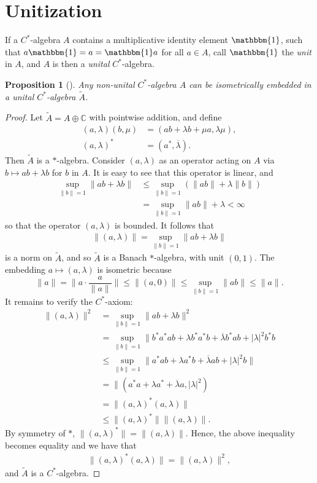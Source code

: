 \documentclass[12pt,a4paper]{report}
\theoremstyle{plain}
\newtheorem*{prop*}{Proposition}
\theoremstyle{definition}
\newcommand{\1}{\mathbbm{1}}
\newcommand{\C}{\mathbb{C}}
\begin{document}
\section{Unitization}
If a $C^\ast$-algebra $A$ contains a multiplicative identity element $\1$, such that 
$a \1 = a = \1  a$ for all $a \in A$, call $\1$ the \emph{unit} 
in $A$, and $A$ is then a \emph{unital} $C^\ast$-algebra.

\begin{prop*}[{\cite[I.1.3]{davidson96}}]
	Any non-unital $C^\ast$-algebra $A$ can be isometrically embedded in a unital $C^\ast$-algebra 
	$\tilde{A}$.
\end{prop*}
\begin{proof}
	Let $\tilde{A} = A \oplus \C$ with pointwise addition, and define
	\begin{align*}
		(a,\lambda) (b,\mu) &= (ab+\lambda b + \mu a, \lambda \mu),				\\
		(a,\lambda)^\ast &= (a^\ast,\overline{\lambda}).
	\end{align*}
	Then $\tilde{A}$ is a $\ast$-algebra. 
	Consider $(a,\lambda)$ as an operator acting on $A$ via $b\mapsto ab+\lambda b$ for $b$ in $A$. It 
	is easy to see that this operator is linear, and 
	\begin{align*}
				\sup_{\|b\|=1}\|ab+\lambda b\| 
		&\leq 	\sup_{\|b\|=1} (\|ab\|+ \lambda\|b\|)							\\
		&=		\sup_{\|b\|=1} \|ab\|+ \lambda < \infty
	\end{align*}
	so that the operator $(a,\lambda)$ is bounded. It follows that
	\begin{align*}
		\|(a,\lambda)\| = \sup_{\|b\|=1}\|ab+\lambda b\|
	\end{align*}
	is a norm on $\tilde{A}$, and so $\tilde{A}$ is a Banach $\ast$-algebra, with unit $(0,1)$.
	The embedding $a\mapsto(a,\lambda)$ is isometric because 
	\[
		\|a\| = \|a\cdot\frac{a}{\|a\|}\| \leq \|(a,0)\| \leq \sup_{\|b\|=1}{\|ab\|} \leq \|a\|.
	\]
	It remains to verify the $C^\ast$-axiom:
	\begin{align*}
				\|(a,\lambda)\|^2 
		&=		\sup_{\|b\|=1}{\|ab+\lambda b\|^2}								\\
		&=		\sup_{\|b\|=1}{\|b^\ast a^\ast ab 
								+\lambda b^\ast a^\ast b
								+\overline{\lambda}b^\ast a b
								+|\lambda|^2 b^\ast b}							\\
		&\leq	\sup_{\|b\|=1}{\|a^\ast ab 
								+\lambda a^\ast b
								+\overline{\lambda}a b
								+|\lambda|^2 b\|}								\\
		&=		\|(a^\ast a + \lambda a^\ast +\overline{\lambda}a,|\lambda|^2)	\\
		&= 		\|(a,\lambda)^\ast(a,\lambda)\|									\\
		&\leq	\|(a,\lambda)^\ast\| \|(a,\lambda)\|.
	\end{align*}
	By symmetry of $\ast$, $\|(a,\lambda)^\ast\| = \|(a,\lambda)\|$. 
	Hence, the above inequality becomes equality and we have that
	\begin{align*}
		\|(a,\lambda)^\ast(a,\lambda)\| = \|(a,\lambda)\|^2,
	\end{align*}
	and $\tilde A$ is a $C^\ast$-algebra.
\end{proof}
\end{document}
